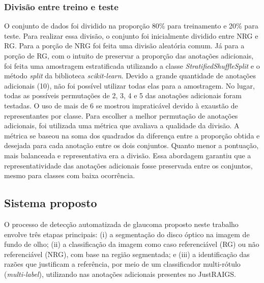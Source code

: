\documentclass[12pt]{article}
\begin{document}
\subsubsection{Divisão entre treino e teste}
\label{sec:dataset:split}

O conjunto de dados foi dividido na proporção 80\% para treinamento e 20\% para teste. Para realizar essa divisão, o conjunto foi inicialmente dividido entre NRG e RG. Para a porção de NRG foi feita uma divisão aleatória comum. Já para a porção de RG, com o intuito de preservar a proporção das anotações adicionais, foi feita uma amostragem estratificada utilizando a classe \emph{StratifiedShuffleSplit} e o método \emph{split} da biblioteca \emph{scikit-learn}. Devido a grande quantidade de anotações adicionais (10), não foi possível utilizar todas elas para a amostragem. No lugar, todas as possíveis permutações de 2, 3, 4 e 5 das anotações adicionais foram testadas. O uso de mais de 6 se mostrou impraticável devido à exaustão de representantes por classe. Para escolher a melhor permutação de anotações adicionais, foi utilizada uma métrica que avaliava a qualidade da divisão. A métrica se baseou na soma dos quadrados da diferença entre a proporção obtida e desejada para cada anotação entre os dois conjuntos. Quanto menor a pontuação, mais balanceada e representativa era a divisão. Essa abordagem garantiu que a representatividade das anotações adicionais fosse preservada entre os conjuntos, mesmo para classes com baixa ocorrência.

\subsection{Sistema proposto}
\label{sec:pipeline}

O processo de detecção automatizada de glaucoma proposto neste trabalho envolve três etapas principais: (i) a segmentação do disco óptico na imagem de fundo de olho; (ii) a classificação da imagem como caso referenciável (RG) ou não referenciável (NRG), com base na região segmentada; e (iii) a identificação das razões que justificam a referência, por meio de um classificador multi-rótulo (\emph{multi-label}), utilizando nas anotações adicionais presentes no JustRAIGS.





\end{document}
